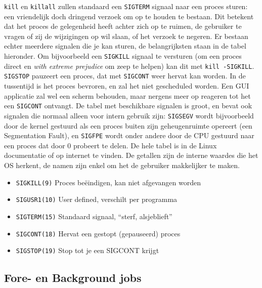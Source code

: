 \texttt{kill} en \texttt{killall} zullen standaard een \texttt{SIGTERM} signaal naar een proces sturen: een vriendelijk doch dringend verzoek om op te houden te bestaan. Dit betekent dat het proces de gelegenheid heeft achter zich op te ruimen, de gebruiker te vragen of zij de wijzigingen op wil slaan, of het verzoek te negeren. Er bestaan echter meerdere signalen die je kan sturen, de belangrijksten staan in de tabel hieronder. Om bijvoorbeeld een \texttt{SIGKILL} signaal te versturen (om een proces direct en \emph{with extreme prejudice} om zeep te helpen) kan dit met \texttt{kill\ -SIGKILL}. \texttt{SIGSTOP} pauzeert een proces, dat met \texttt{SIGCONT} weer hervat kan worden. In de tussentijd is het proces bevroren, en zal het niet gescheduled worden. Een GUI applicatie zal wel een scherm behouden, maar nergens meer op reageren tot het een \texttt{SIGCONT} ontvangt. De tabel met beschikbare signalen is groot, en bevat ook signalen die normaal alleen voor intern gebruik zijn: \texttt{SIGSEGV} wordt bijvoorbeeld door de kernel gestuurd als een proces buiten zijn geheugenruimte opereert (een Segmentation Fault), en \texttt{SIGFPE} wordt onder andere door de CPU gestuurd naar een proces dat door 0 probeert te delen. De hele tabel is in de Linux documentatie of op internet te vinden. De getallen zijn de interne waardes die het OS herkent, de namen zijn enkel om het de gebruiker makkelijker te maken.

\begin{itemize}
  \item \texttt{SIGKILL(9)} Proces beëindigen, kan niet afgevangen worden \\
  \item \texttt{SIGUSR1(10)} User defined, verschilt per programma \\
  \item \texttt{SIGTERM(15)} Standaard signaal, ``sterf, alsjeblieft'' \\
  \item \texttt{SIGCONT(18)} Hervat een gestopt (gepauseerd) proces \\
  \item \texttt{SIGSTOP(19)} Stop tot je een SIGCONT krijgt \\
\end{itemize}

\subsection{Fore- en Background jobs}\label{fore--en-background-jobs}

